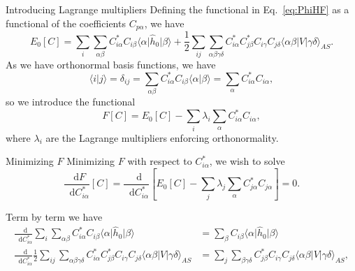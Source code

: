 \documentclass[UKenglish,aspectratio=169]{beamer}
\newcommand*\diff{\mathop{}\!\mathrm{d}}
\begin{document}
\begin{frame}{Introducing Lagrange multipliers}
    Defining the functional in Eq.~\eqref{eq:PhiHF} as a functional of the coefficients $C_{p\alpha}$, we have
    \begin{equation}%
        E_0[C]
        = \sum_{i} \sum_{\alpha\beta} {
            C_{i \alpha}^*
            C_{i \beta}
            \langle \alpha \vert \hat{h}_0 \vert \beta \rangle
        }
        + \frac{1}{2} \sum_{ij} \sum_{\alpha\beta\gamma\delta} {
            C_{i \alpha}^*
            C_{j \beta}^*
            C_{i \gamma}
            C_{j \delta}
            \langle \alpha\beta \vert V \vert \gamma\delta \rangle_{AS}
        }.
    \end{equation}
    As we have orthonormal basis functions, we have
    \begin{equation}
        \langle i \vert j \rangle
        = \delta_{ij} = \sum_{\alpha\beta} C_{i\alpha}^* C_{i\beta} \langle \alpha \vert \beta \rangle = \sum_{\alpha} C_{i\alpha}^* C_{i\alpha},
    \end{equation}
    so we introduce the functional
    \begin{equation}
        F[C] = E_0[C] - \sum_{i} \lambda_i \sum_{\alpha} C_{i\alpha}^* C_{i\alpha},
    \end{equation}
    where $\lambda_i$ are the Lagrange multipliers enforcing orthonormality.
\end{frame}

\begin{frame}{Minimizing $F$}
    Minimizing $F$ with respect to $C^*_{i\alpha}$, we wish to solve
    \begin{equation}
        \frac{\diff F}{\diff C^*_{i\alpha}}[C] = \frac{\diff}{\diff C_{i \alpha}^*} \left[ E_0[C] - \sum_j \lambda_j \sum_{\alpha} C_{j \alpha}^* C_{j \alpha} \right] = 0.
    \end{equation}

    Term by term we have
    \begin{align}
        \frac{\diff}{\diff C_{i \alpha}^*} \sum_{i} \sum_{\alpha\beta} C_{i \alpha}^* C_{i \beta}
        \langle \alpha \vert \hat{h}_0 \vert \beta \rangle
        &= \sum_{\beta} C_{i \beta}
        \langle \alpha \vert \hat{h}_0 \vert \beta \rangle \\
        \frac{\diff}{\diff C_{i \alpha}^*}
        \frac{1}{2} \sum_{ij} \sum_{\alpha\beta\gamma\delta} C_{i \alpha}^* C_{j \beta}^* C_{i \gamma} C_{j \delta}
        \langle \alpha\beta \vert V \vert \gamma\delta \rangle_{AS}
        &= \sum_j \sum_{\beta\gamma\delta} C_{j \beta}^* C_{i \gamma} C_{j \delta} \langle \alpha\beta \vert V \vert \gamma\delta \rangle_{AS},
    \end{align}
\end{frame}
\end{document}
